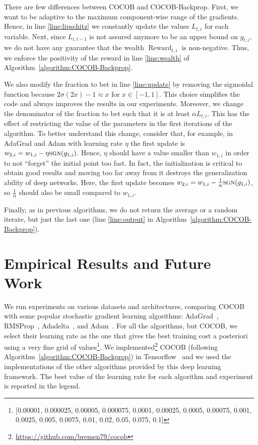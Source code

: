 \documentclass{article}
\DeclareMathOperator{\Reward}{Reward}
\newcommand{\sgn}{\mbox{\sc sgn}}
\begin{document}
There are few differences between COCOB and COCOB-Backprop. First, we want to be adaptive to the maximum component-wise 
range of the gradients. Hence, in line \ref{line:lipschitz} we constantly update the values $L_{t,i}$ for each variable. 
Next, since $L_{i,t-1}$ is not assured anymore to be an upper bound on $g_{t,i}$, we do not have any guarantee that 
the wealth $\Reward_{t,i}$ is non-negative. Thus, we enforce the positivity of the reward in line \ref{line:wealth} of 
Algorithm~\ref{algorithm:COCOB-Backprop}.

We also modify the fraction to bet in line \ref{line:update} by removing the sigmoidal function
because $2\sigma(2x)-1\approx x$ for $x\in[-1,1]$. This choice simplifies the code and always improves 
the results in our experiments. Moreover, we change the denominator of the fraction to bet such that it is 
at least $\alpha L_{t,i}$. This has the effect of restricting the value of the parameters in the first iterations 
of the algorithm. To better understand this change, consider that, for example, in AdaGrad and Adam with learning rate $\eta$ the first update is $w_{2,i}=w_{1,i}-\eta \sgn(g_{1,i})$. Hence, $\eta$ should have a value smaller than $w_{1,i}$ in order to not ``forget'' the initial point too fast. In fact, the initialization is critical to obtain good results and moving too far away from it destroys the generalization ability of deep networks. Here, the first update becomes $w_{2,i}=w_{1,i}-\frac{1}{\alpha}\sgn(g_{1,i})$, so $\frac{1}{\alpha}$ should also be small compared to $w_{1,i}$.

Finally, as in previous algorithms, we do not return the average or a random iterate, but just the last one
(line \ref{line:output} in Algorithm~\ref{algorithm:COCOB-Backprop}).

 \section{Empirical Results and Future Work}
\label{sec:exp}

We run experiments on various datasets and architectures, comparing COCOB with some popular 
stochastic gradient learning algorithms: AdaGrad~\citep{DuchiHS11}, RMSProp~\citep{TielemanH12}, 
Adadelta~\citep{Zeiler12}, and Adam~\citep{KingmaB15}.
For all the algorithms, but COCOB, we select their learning rate as the one that gives the best training cost 
a posteriori using a very fine grid of values\footnote{[0.00001, 0.000025, 0.00005, 0.000075, 0.0001, 0.00025, 
0.0005, 0.00075, 0.001, 0.0025, 0.005, 0.0075, 0.01, 0.02, 0.05, 0.075, 0.1]}. 
We implemented\footnote{\url{https://github.com/bremen79/cocob}} COCOB (following Algorithm~\ref{algorithm:COCOB-Backprop}) in Tensorflow~\citep{tensorflow2015-whitepaper} 
and we used the implementations of the other algorithms provided by this deep learning framework.
The best value of the learning rate for each algorithm and experiment is reported in the legend.
\end{document}
